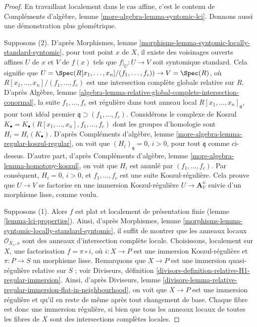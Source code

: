 \begin{proof}
En travaillant localement dans le cas affine, c'est le contenu de
Compléments d'algèbre, lemme \ref{more-algebra-lemma-syntomic-lci}.
Donnons aussi une démonstration plus géométrique.

\medskip\noindent
Supposons (2). D'après
Morphismes, lemme \ref{morphisms-lemma-syntomic-locally-standard-syntomic},
pour tout point $x$ de $X$, il existe des voisinages ouverts affines
$U$ de $x$ et $V$ de $f(x)$ tels que $f|_U : U \to V$ soit syntomique standard.
Cela signifie que $U = \Spec(R[x_1, \ldots, x_n]/(f_1, \ldots, f_c))
\to V = \Spec(R)$, où $R[x_1, \ldots, x_n]/(f_1, \ldots, f_c)$ est une
intersection complète globale relative sur $R$. D'après
Algèbre,
lemme \ref{algebra-lemma-relative-global-complete-intersection-conormal},
la suite $f_1, \ldots, f_c$ est régulière dans tout anneau local
$R[x_1, \ldots, x_n]_{\mathfrak q}$, pour tout idéal premier
$\mathfrak q \supset (f_1, \ldots, f_c)$. Considérons le complexe de Koszul
$K_\bullet = K_\bullet(R[x_1, \ldots, x_n], f_1, \ldots, f_c)$
dont les groupes d'homologie sont $H_i = H_i(K_\bullet)$. D'après
Compléments d'algèbre, lemme \ref{more-algebra-lemma-regular-koszul-regular},
on voit que $(H_i)_{\mathfrak q} = 0$, $i > 0$, pour tout $\mathfrak q$
comme ci-dessus. D'autre part, d'après
Compléments d'algèbre, lemme \ref{more-algebra-lemma-homotopy-koszul},
on voit que $H_i$ est annulé par $(f_1, \ldots, f_c)$. Par conséquent,
$H_i = 0$, $i > 0$, et $f_1, \ldots, f_c$ est une suite Koszul-régulière.
Cela prouve que $U \to V$ se factorise en une immersion Koszul-régulière
$U \to \mathbf{A}^n_V$ suivie d'un morphisme lisse, comme voulu.

\medskip\noindent
Supposons (1). Alors $f$ est plat et localement de présentation finie
(lemme \ref{lemma-lci-properties}).
Ainsi, d'après
Morphismes, lemme \ref{morphisms-lemma-syntomic-locally-standard-syntomic},
il suffit de montrer que les anneaux locaux $\mathcal{O}_{X_s, x}$
sont des anneaux d'intersection complète locale. Choisissons, localement sur $X$, une factorisation
$f = \pi \circ i$, où $i : X \to P$ est une immersion Koszul-régulière
et $\pi : P \to S$ un morphisme lisse. Remarquons que $X \to P$ est
une immersion quasi-régulière relative sur $S$ ; voir
Diviseurs, définition \ref{divisors-definition-relative-H1-regular-immersion}.
Ainsi, d'après
Diviseurs,
lemme \ref{divisors-lemma-relative-regular-immersion-flat-in-neighbourhood},
on voit que $X \to P$ est une immersion régulière et qu'il en reste de même
après tout changement de base. Chaque fibre est donc une immersion régulière, si bien que
tous les anneaux locaux de toutes les fibres de $X$ sont des intersections complètes locales.
\end{proof}

